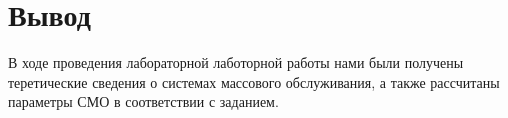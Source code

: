 \section{Вывод}

В ходе проведения лабораторной лаботорной работы нами были получены теретические сведения о системах массового обслуживания, а также рассчитаны параметры СМО в соответствии с заданием.
 
\clearpage